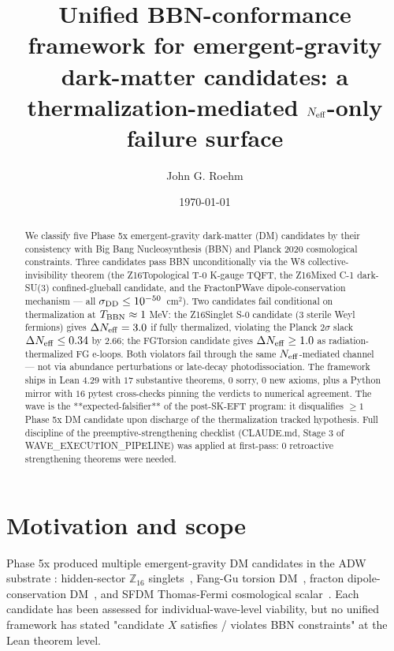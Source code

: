 \documentclass[twocolumn]{revtex4-2}
\newcommand{\dNeff}{\Delta N_{\rm eff}}
\begin{document}
\title{Unified BBN-conformance framework for emergent-gravity dark-matter
candidates: a thermalization-mediated $N_{\rm eff}$-only failure surface}

\author{John G. Roehm}

\date{\today}

\begin{abstract}
We classify five Phase 5x emergent-gravity dark-matter (DM) candidates
by their consistency with Big Bang Nucleosynthesis (BBN) and Planck
2020 cosmological constraints. Three candidates pass BBN
unconditionally via the W8 collective-invisibility theorem (the
Z16Topological T-0 K-gauge TQFT, the Z16Mixed C-1 dark-SU(3)
confined-glueball candidate, and the FractonPWave dipole-conservation
mechanism — all $\sigma_{\rm DD} \le 10^{-50}$~cm$^2$). Two candidates
fail conditional on thermalization at $T_{\rm BBN} \approx 1$ MeV: the
Z16Singlet S-0 candidate (3 sterile Weyl fermions) gives
$\dNeff = 3.0$ if fully thermalized, violating the Planck $2\sigma$
slack $\dNeff \le 0.34$ by $2.66$; the FGTorsion candidate gives
$\dNeff \ge 1.0$ as radiation-thermalized FG e-loops. Both violators
fail through the same $N_{\rm eff}$-mediated channel — not via abundance
perturbations or late-decay photodissociation. The framework ships in
Lean 4.29 with $17$ substantive theorems, $0$ sorry, $0$ new axioms,
plus a Python mirror with $16$ pytest cross-checks pinning the verdicts
to numerical agreement. The wave is the **expected-falsifier** of the
post-SK-EFT program: it disqualifies $\ge 1$ Phase 5x DM candidate
upon discharge of the thermalization tracked hypothesis. Full discipline
of the preemptive-strengthening checklist (CLAUDE.md, Stage 3 of
WAVE\_EXECUTION\_PIPELINE) was applied at first-pass: 0 retroactive
strengthening theorems were needed.
\end{abstract}

\maketitle

\section{Motivation and scope}
\label{sec:intro}

Phase 5x produced multiple emergent-gravity DM candidates in the
ADW substrate
\cite{DarkSectorSynthesisLean}: hidden-sector $\mathbb{Z}_{16}$
singlets~\cite{HiddenSectorClassificationLean}, Fang-Gu torsion
DM~\cite{FangGu2024,FangGuLean}, fracton dipole-conservation
DM~\cite{Pretko2017,FractonDarkMatterLean}, and
SFDM Thomas-Fermi cosmological scalar~\cite{Berezhiani2015}.
Each candidate has been assessed for individual-wave-level viability,
but no unified framework has stated "candidate $X$ satisfies / violates
BBN constraints" at the Lean theorem level.
\end{document}
